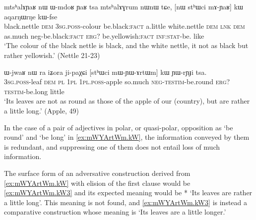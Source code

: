 \documentclass[oldfontcommands,oneside,a4paper,11pt]{article}
\newcommand{\ipa}[1]{{\phon #1}} %
\begin{document}
        \begin{exe}
  \ex  \label{ex:mAYaR.kW}  
  \gll 
  \ipa{mtsʰalɤɲaʁ} 	\ipa{nɯ} 	\ipa{ɯ-mdoʁ} 	\ipa{ɲaʁ} 	\ipa{tsa} 	\ipa{mtsʰalɤɣrum} 	\ipa{nɯnɯ} 	\ipa{tɕe,} 	[\ipa{nɯ} \ipa{stʰɯci} 	\ipa{mɤ-ɲaʁ}] 	\ipa{kɯ}   	\ipa{aqarŋɯrŋe} 	\ipa{kɯ-fse} 	\\
  black.nettle \textsc{dem} \textsc{3sg.poss}-colour be.black:\textsc{fact} a.little   white.nettle \textsc{dem} \textsc{lnk} \textsc{dem} as.much neg-be.black:\textsc{fact}  \textsc{erg?} be.yellowish:\textsc{fact} \textsc{inf:stat}-be. like \\
  \glt `The colour of the black nettle is black, and the white nettle, it not as   black but rather yellowish.'   (Nettle 21-23)
        \end{exe}
        
           \begin{exe}
  \ex  \label{ex:mWYArtWm.kW}  
  \gll      
\ipa{ɯ-jwaʁ} 	\ipa{nɯ} \ipa{ra} 	\ipa{iʑora} 	\ipa{ji-paχɕi} 	[\ipa{stʰɯci} 	\ipa{mɯ-ɲɯ-ɤrtɯm}] 	\ipa{kɯ} 	\ipa{ɲɯ-rɲɟi} 	\ipa{tsa.} \\
\textsc{3sg.poss}-leaf \textsc{dem} \textsc{pl} \textsc{1pl} \textsc{1pl.poss}-apple so.much \textsc{neg-testim}-be.round \textsc{erg?} \textsc{testim}-be.long little \\
\glt `Its leaves  are not as round as those of the apple of our (country), but are rather a little long.'
(Apple, 49)
          \end{exe} 
 
% 
          
          In the case of a pair of adjectives in polar, or quasi-polar, opposition as `be round' and  `be long' in \ref{ex:mWYArtWm.kW}, the information conveyed by them is redundant, and suppressing one of them does not entail loss of much information.   
          
          The surface form of an adversative construction derived from \ref{ex:mWYArtWm.kW}  with elision  of the first clause would be  \ref{ex:mWYArtWm.kW3}  and its expected meaning would be * `Its leaves are  rather a little long'.   This meaning is not found, and \ref{ex:mWYArtWm.kW3}   is instead a comparative construction whose meaning is `Its leaves are a little longer.' 
            
\end{document}
